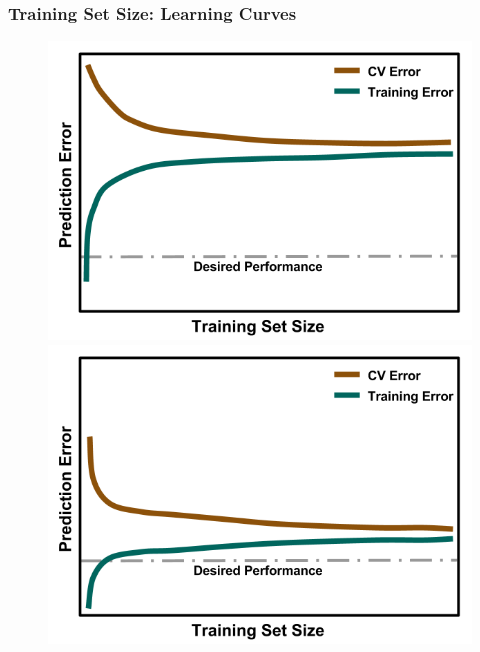 
\begin{frame}
  \frametitle{Training Set Size: Learning Curves}
  \centering
  \begin{figure}[h!]
    \centering
    \begin{minipage}{0.35\textwidth}
      \centering
      \includegraphics[width=\linewidth]{./figures/LearningCurve-bias.png}
    \end{minipage}%
    \begin{minipage}{0.35\textwidth}
      \centering
      \includegraphics[width=\linewidth]{./figures/LearningCurve-ideal.png}
    \end{minipage}%
    \begin{minipage}{0.35\textwidth}
      \centering

\end{minipage}
\end{figure}
\end{frame}
